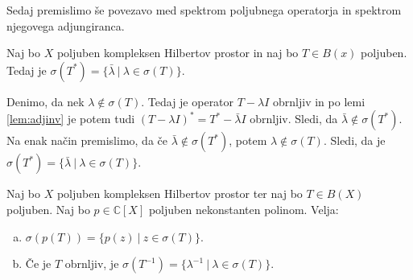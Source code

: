 \documentclass[mat2]{matdelo}
\newcommand{\C}{\mathbb{C}}
\begin{document}
\begin{dokaz}
\begin{enumerate}[a)]
			\end{enumerate}
		\end{dokaz}
		
		Sedaj premislimo še povezavo med spektrom poljubnega operatorja in spektrom njegovega adjungiranca.
		
		\begin{lema}
			\label{lem:adjspec}
			Naj bo $X$ poljuben kompleksen Hilbertov prostor in naj bo $T\in B(x)$ poljuben. Tedaj je $\sigma(T^*)=\{\bar{\lambda}~|~\lambda\in\sigma(T)\}$.
		\end{lema}
		
		\begin{dokaz}
			Denimo, da nek $\lambda\notin\sigma(T)$. Tedaj je operator $T-\lambda I$ obrnljiv in po lemi \ref{lem:adjinv} je potem tudi $(T-\lambda I)^* = T^* - \bar{\lambda}I$ obrnljiv. Sledi, da $\bar{\lambda}\notin\sigma(T^*)$. Na enak način premislimo, da če $\bar{\lambda}\notin\sigma(T^*)$, potem $\lambda\notin\sigma(T)$. Sledi, da je $\sigma(T^*) =\{\bar{\lambda}~|~\lambda\in\sigma(T)\}$.
		\end{dokaz}
		
		\begin{izrek}
			\label{izr:polyspec}
			Naj bo $X$ poljuben kompleksen Hilbertov prostor ter naj bo $T\in B(X)$ poljuben. Naj bo $p\in\C[X]$ poljuben nekonstanten polinom. Velja: \begin{enumerate}[a)]
				\item $\sigma(p(T))=\{p(z)~|~z\in\sigma(T)\}$.
				\item Če je $T$ obrnljiv, je $\sigma(T^{-1})=\{\lambda^{-1}~|~\lambda\in\sigma(T)\}$.
			\end{enumerate}
		\end{izrek}
		
\end{document}
